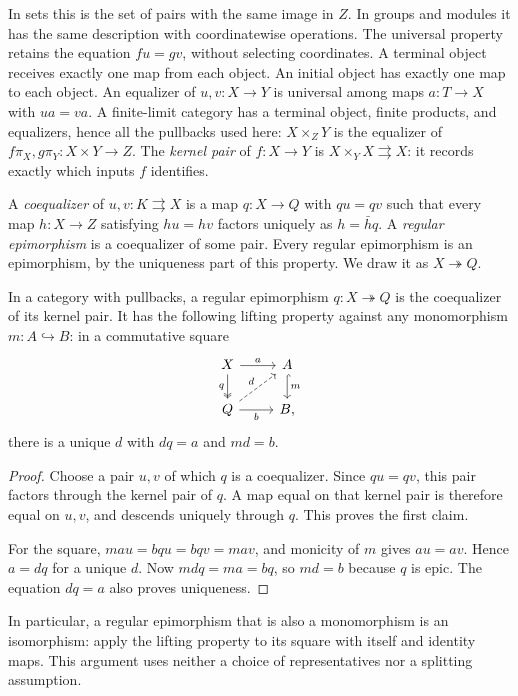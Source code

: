 In sets this is the set of pairs with the same image in $Z$. In groups
and modules it has the same description with coordinatewise operations.
The universal property retains the equation $fu=gv$, without selecting
coordinates. A terminal object receives exactly one map from each object.
An initial object has exactly one map to each object.
An equalizer of $u,v:X\to Y$ is universal among maps $a:T\to X$ with
$ua=va$. A finite-limit category has a terminal object, finite products,
and equalizers, hence all the pullbacks used here: $X\times_ZY$ is the
equalizer of $f\pi_X,g\pi_Y:X\times Y\to Z$. The
\emph{kernel pair} of $f:X\to Y$ is
$X\times_YX\rightrightarrows X$: it records exactly which inputs $f$
identifies.

A \emph{coequalizer} of $u,v:K\rightrightarrows X$ is a map $q:X\to Q$
with $qu=qv$ such that every map $h:X\to Z$ satisfying $hu=hv$ factors
uniquely as $h=\bar hq$. A \emph{regular epimorphism} is a coequalizer
of some pair. Every regular epimorphism is an epimorphism, by the
uniqueness part of this property. We draw it as $X\twoheadrightarrow Q$.

\begin{lemma}\label{f:descent}
In a category with pullbacks, a regular epimorphism $q:X\twoheadrightarrow Q$
is the coequalizer of its kernel pair. It has the following lifting
property against any monomorphism $m:A\hookrightarrow B$: in a
commutative square
\[
\begin{tikzcd}
X \arrow[r,"a"] \arrow[d,two heads,"q"'] & A \arrow[d,hook,"m"]\\
Q \arrow[r,"b"'] \arrow[ur,dashed,"d"] & B,
\end{tikzcd}
\]
there is a unique $d$ with $dq=a$ and $md=b$.
\end{lemma}
\begin{proof}
Choose a pair $u,v$ of which $q$ is a coequalizer. Since $qu=qv$, this
pair factors through the kernel pair of $q$. A map equal on that kernel
pair is therefore equal on $u,v$, and descends uniquely through $q$.
This proves the first claim.

For the square, $ma u=bq u=bq v=ma v$, and monicity of $m$ gives
$a u=a v$. Hence $a=dq$ for a unique $d$. Now $mdq=ma=bq$, so
$md=b$ because $q$ is epic. The equation $dq=a$ also proves uniqueness.
\end{proof}

In particular, a regular epimorphism that is also a monomorphism is an
isomorphism: apply the lifting property to its square with itself and
identity maps. This argument uses neither a choice of representatives nor
a splitting assumption.

